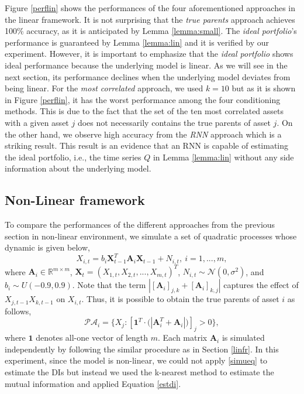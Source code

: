 Figure \ref{perflin} shows the performances of the four aforementioned approaches in the linear framework. 
It is not surprising that the \textit{true parents} approach achieves 100\% accuracy, as it is anticipated by Lemma \ref{lemma:small}.
The \textit{ideal portfolio}'s performance is guaranteed by Lemma \ref{lemma:lin} and it is verified by our experiment.
However, it is important to emphasize that the \textit{ideal portfolio} shows ideal performance because the underlying model is linear. 
As we will see in the next section, its performance declines when the underlying model deviates from being linear. 
For the \textit{most correlated} approach, we used $k=10$ but as it is shown in Figure \ref{perflin}, it has the worst performance among the four conditioning methods. 
This is due to the fact that the set of the ten most correlated assets with a given asset $j$ does not necessarily contains the true parents of asset $j$.
On the other hand, we observe high accuracy from the \textit{RNN} approach which is a striking result.
This result is an evidence that an RNN is capable of estimating the ideal portfolio, i.e., the time series $Q$ in Lemma \ref{lemma:lin} without any side information about the underlying model. 





\subsection{Non-Linear framework} \label{nonlinfr}
To compare the performances of the different approaches from the previous section in non-linear environment, we simulate a set of quadratic processes whose dynamic is given below, 
\begin{equation}\label{eq:ex_non}
        X_{i,t} =b_i  {\textbf{X}^T_{t-1}} \textbf{A}_i \textbf{X}_{t-1} + N_{i,t}, \ i=1,...,m,
\end{equation}
where $\textbf{A}_i\in\mathbb{R}^{m \times m}$, $\textbf{X}_t = (X_{1,t}, X_{2,t},..., X_{m,t})^T$, $N_{i,t}\sim\mathcal{N}(0,\sigma^2)$, and $b_i\sim U(-0.9 , 0.9)$.
Note that the term $|[\textbf{A}_i]_{j,k} + [\textbf{A}_i]_{k,j}|$ captures the effect of $X_{j,t-1}X_{k,t-1}$ on $X_{i,t}$. Thus, it is possible to obtain the true parents of asset $i$ as follows,
\begin{equation}
 \mathcal{PA}_i = \{ X_j :  [\textbf{1}^T \cdot \big(|\textbf{A}^T_i + \textbf{A}_i|\big)]_{j}  > 0\},
\end{equation}
where $\textbf{1}$ denotes all-one vector of length $m$.
Each matrix $\textbf{A}_i$ is simulated independently by following the similar procedure as in Section \ref{linfr}.
In this experiment, since the model is non-linear, we could not apply \eqref{simueq} to estimate the DIs but instead we used the k-nearest method to estimate the mutual information and applied Equation \eqref{estdi}.


